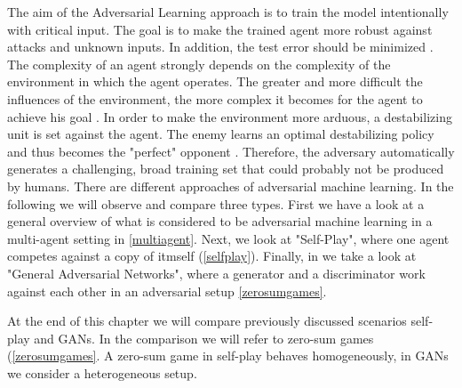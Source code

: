The aim of the Adversarial Learning approach is to train the model intentionally with critical input. The goal is to make the trained agent more robust against attacks and unknown inputs. In addition, the test error should be minimized \cite{MachineLearningAtScale}.
The complexity of an agent strongly depends on the complexity of the environment in which the agent operates. The greater and more difficult the influences of the environment, the more complex it becomes for the agent to achieve his goal \cite{environmentBansal2017Oct}.
In order to make the environment more arduous, a destabilizing unit is set against the agent. The enemy learns an optimal destabilizing policy and thus becomes the "perfect" opponent \cite{robustPinto2017Mar}. Therefore, the adversary automatically generates a challenging, broad training set that could probably not be produced by humans.
There are different approaches of adversarial machine learning. In the following we will observe and compare three types. First we have a look at a general overview of what is considered to be adversarial machine learning in a multi-agent setting in \ref{multiagent}. Next, we look at "Self-Play", where one agent competes against a copy of itmself (\ref{selfplay}). Finally, in \label{gans} we take a look at "General Adversarial Networks", where a generator and a discriminator work against each other in an adversarial setup \ref{zerosumgames}.

At the end of this chapter we will compare previously discussed scenarios self-play and GANs. In the comparison we will refer to zero-sum games (\ref{zerosumgames}. A zero-sum game in self-play behaves homogeneously, in GANs we consider a heterogeneous setup. 